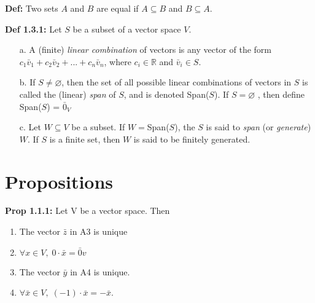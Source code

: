 \textbf{Def:} Two sets $A$ and $B$ are equal if $A \subseteq B$ and $B \subseteq A$.

\bigskip
\noindent
\textbf{Def 1.3.1:} Let $S$ be a subset of a vector space $V$.
\begin{itemize}
    \item[a.] A (finite) \textit{linear combination} of vectors is any vector of the form $c_1 \bar v_1 + c_2 \bar v_2 + ... + c_n \bar v_n$, where $ c_i \in \mathbb{R}$ and $\bar v_i \in S$.
    \item[b.] If $S \neq \varnothing $, then the set of all possible linear combinations of vectors in $S$ is called the (linear) \textit{span} of $S$, and is denoted Span($S$). 
    \newline If $ S = \varnothing$ , then define Span($S$) = {$\bar 0_V$}
    \item[c.] Let $W \subseteq V$ be a subset. If $W = $Span($S$), the $S$ is said to \textit{span} (or \textit{generate}) $W$. If $S$ is a finite set, then $W$ is said to be finitely generated.
\end{itemize}

\pagebreak
\section{Propositions}

\textbf{Prop 1.1.1:} Let V be a vector space. Then
\begin{enumerate}
    \item The vector $\bar z $ in A3 is unique
    \item $\forall x \in V, \; 0 \cdot \bar x = \bar 0 v$
    \item The vector $\bar y$ in A4 is unique.
    \item $\forall \bar x \in V, \; (-1) \cdot \bar x = -\bar x.$
\end{enumerate}